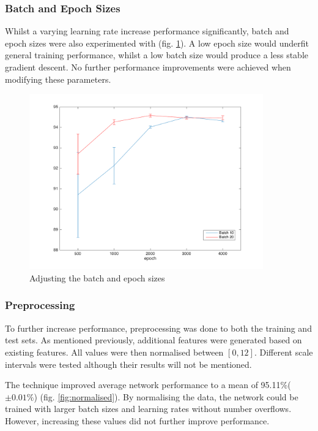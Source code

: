 \documentclass[11]{article}
\begin{document}
\subsubsection{Batch and Epoch Sizes}
Whilst a varying learning rate increase performance significantly, batch and epoch sizes were also experimented with (fig. \ref{fig:batchandepoch}). A low epoch size would underfit general training performance, whilst a low batch size would produce a less stable gradient descent. No further performance improvements were achieved when modifying these parameters. 

\begin{figure}
\centering
\includegraphics[width=0.9\textwidth]{batchandepoch.png}
\caption{Adjusting the batch and epoch sizes}
\label{fig:batchandepoch}
\end{figure}

\subsubsection{Preprocessing}
To further increase performance, preprocessing was done to both the training and test sets. As mentioned previously, additional features were generated based on existing features. All values were then normalised between $[0,12]$. Different scale intervals were tested although their results will not be mentioned. 

The technique improved average network performance to a mean of 95.11\%($\pm 0.01\%$) (fig. \ref{fig:normalised}). By normalising the data, the network could be trained with larger batch sizes and learning rates without number overflows. However, increasing these values did not further improve performance. 
\end{document}
